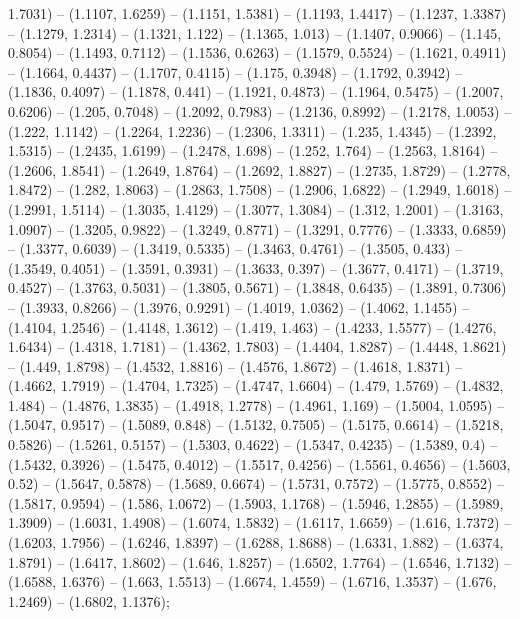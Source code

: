 1.7031) -- (1.1107, 1.6259) -- (1.1151, 1.5381) -- (1.1193, 1.4417) -- (1.1237, 1.3387) -- (1.1279, 1.2314) -- (1.1321, 1.122) -- (1.1365, 1.013) -- (1.1407, 0.9066) -- (1.145, 0.8054) -- (1.1493, 0.7112) -- (1.1536, 0.6263) -- (1.1579, 0.5524) -- (1.1621, 0.4911) -- (1.1664, 0.4437) -- (1.1707, 0.4115) -- (1.175, 0.3948) -- (1.1792, 0.3942) -- (1.1836, 0.4097) -- (1.1878, 0.441) -- (1.1921, 0.4873) -- (1.1964, 0.5475) -- (1.2007, 0.6206) -- (1.205, 0.7048) -- (1.2092, 0.7983) -- (1.2136, 0.8992) -- (1.2178, 1.0053) -- (1.222, 1.1142) -- (1.2264, 1.2236) -- (1.2306, 1.3311) -- (1.235, 1.4345) -- (1.2392, 1.5315) -- (1.2435, 1.6199) -- (1.2478, 1.698) -- (1.252, 1.764) -- (1.2563, 1.8164) -- (1.2606, 1.8541) -- (1.2649, 1.8764) -- (1.2692, 1.8827) -- (1.2735, 1.8729) -- (1.2778, 1.8472) -- (1.282, 1.8063) -- (1.2863, 1.7508) -- (1.2906, 1.6822) -- (1.2949, 1.6018) -- (1.2991, 1.5114) -- (1.3035, 1.4129) -- (1.3077, 1.3084) -- (1.312, 1.2001) -- (1.3163, 1.0907) -- (1.3205, 0.9822) -- (1.3249, 0.8771) -- (1.3291, 0.7776) -- (1.3333, 0.6859) -- (1.3377, 0.6039) -- (1.3419, 0.5335) -- (1.3463, 0.4761) -- (1.3505, 0.433) -- (1.3549, 0.4051) -- (1.3591, 0.3931) -- (1.3633, 0.397) -- (1.3677, 0.4171) -- (1.3719, 0.4527) -- (1.3763, 0.5031) -- (1.3805, 0.5671) -- (1.3848, 0.6435) -- (1.3891, 0.7306) -- (1.3933, 0.8266) -- (1.3976, 0.9291) -- (1.4019, 1.0362) -- (1.4062, 1.1455) -- (1.4104, 1.2546) -- (1.4148, 1.3612) -- (1.419, 1.463) -- (1.4233, 1.5577) -- (1.4276, 1.6434) -- (1.4318, 1.7181) -- (1.4362, 1.7803) -- (1.4404, 1.8287) -- (1.4448, 1.8621) -- (1.449, 1.8798) -- (1.4532, 1.8816) -- (1.4576, 1.8672) -- (1.4618, 1.8371) -- (1.4662, 1.7919) -- (1.4704, 1.7325) -- (1.4747, 1.6604) -- (1.479, 1.5769) -- (1.4832, 1.484) -- (1.4876, 1.3835) -- (1.4918, 1.2778) -- (1.4961, 1.169) -- (1.5004, 1.0595) -- (1.5047, 0.9517) -- (1.5089, 0.848) -- (1.5132, 0.7505) -- (1.5175, 0.6614) -- (1.5218, 0.5826) -- (1.5261, 0.5157) -- (1.5303, 0.4622) -- (1.5347, 0.4235) -- (1.5389, 0.4) -- (1.5432, 0.3926) -- (1.5475, 0.4012) -- (1.5517, 0.4256) -- (1.5561, 0.4656) -- (1.5603, 0.52) -- (1.5647, 0.5878) -- (1.5689, 0.6674) -- (1.5731, 0.7572) -- (1.5775, 0.8552) -- (1.5817, 0.9594) -- (1.586, 1.0672) -- (1.5903, 1.1768) -- (1.5946, 1.2855) -- (1.5989, 1.3909) -- (1.6031, 1.4908) -- (1.6074, 1.5832) -- (1.6117, 1.6659) -- (1.616, 1.7372) -- (1.6203, 1.7956) -- (1.6246, 1.8397) -- (1.6288, 1.8688) -- (1.6331, 1.882) -- (1.6374, 1.8791) -- (1.6417, 1.8602) -- (1.646, 1.8257) -- (1.6502, 1.7764) -- (1.6546, 1.7132) -- (1.6588, 1.6376) -- (1.663, 1.5513) -- (1.6674, 1.4559) -- (1.6716, 1.3537) -- (1.676, 1.2469) -- (1.6802, 1.1376);



